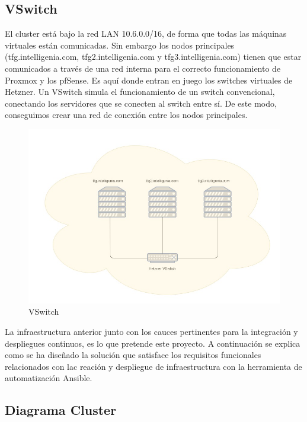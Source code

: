 \subsection{VSwitch}
\begin{text}
	El cluster está bajo la red LAN 10.6.0.0/16, de forma que todas las máquinas virtuales están comunicadas. Sin embargo los nodos principales (tfg.intelligenia.com, tfg2.intelligenia.com y tfg3.intelligenia.com) tienen que estar comunicados a través de una red interna para el correcto funcionamiento de Proxmox y los pfSense.
	Es aquí donde entran en juego los switches virtuales de Hetzner. Un VSwitch simula el funcionamiento de un switch convencional, conectando los servidores que se conecten al switch entre sí. De este modo, conseguimos crear una red de conexión entre los nodos principales.
	
	\begin{figure}[!hbt]
		\centering
		\includegraphics[scale=0.4]{imagenes/Analisis/vswitch.jpg}
		\caption[VSwitch]{VSwitch}
		\label{VSwitch}
	\end{figure}
\end{text}

\begin{text}
	La infraestructura anterior junto con los cauces pertinentes para la integración y despliegues continuos, es lo que pretende este proyecto. A continuación se explica como se ha diseñado la solución que satisface los requisitos funcionales relacionados con lac reación y despliegue de infraestructura con la herramienta de automatización Ansible.
\end{text}
\clearpage

\subsection{Diagrama Cluster}

